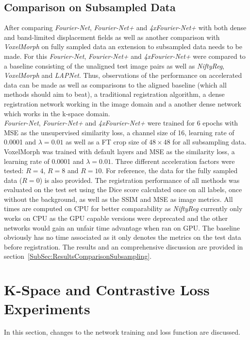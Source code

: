 \documentclass[english,version-2022-01]{uzl-thesis} %
\begin{document}
\subsection{Comparison on Subsampled Data} \label{SubSec:ComparisonSubsampling}
After comparing \emph{Fourier-Net}, \emph{Fourier-Net+} and \emph{4xFourier-Net+} with both dense and band-limited displacement fields as well as another comparison with \emph{VoxelMorph} on fully sampled data 
an extension to subsampled data needs to be made. For this \emph{Fourier-Net}, \emph{Fourier-Net+} and \emph{4xFourier-Net+} were compared to a baseline consisting of the unaligned test image pairs as well as \emph{NiftyReg}, \emph{VoxelMorph} and \emph{LAPNet}. Thus, observations of the performance on accelerated data can be made as well as comparisons to the aligned baseline (which all methods should aim to beat), a traditional registration algorithm, a dense registration network working in the image domain and a another dense network which works in the k-space domain.\\
\emph{Fourier-Net}, \emph{Fourier-Net+} and \emph{4xFourier-Net+} were trained for 6 epochs with MSE as the unsupervised similarity loss, a channel size of 16, learning rate of 0.0001 and $\lambda=0.01$ as well as a FT crop size of $48 \times 48$ for all subsampling data. VoxelMorph was trained with default layers and MSE as the similarity loss, a learning rate of 0.0001 and $\lambda=0.01$. Three different acceleration factors were tested: $R=4$, $R=8$ and $R=10$. For reference, the data for the fully sampled data ($R=0$) is also provided. The registration performance of all methods was evaluated on the test set using the Dice score calculated once on all labels, once without the background, as well as the SSIM and MSE as image metrics. All times are computed on CPU for better comparability as \emph{NiftyReg} currently only works on CPU as the GPU capable versions were deprecated and the other networks would gain an unfair time advantage when ran on GPU. The baseline obviously has no time associated as it only denotes the metrics on the test data before registration. The results and an comprehensive discussion are provided in section~\ref{SubSec:ResultsComparisonSubsampling}.


\section{K-Space and Contrastive Loss Experiments} \label{Sec:K-SpaceAndContrastiveLossExperiments}
In this section, changes to the network training and loss function are discussed.
\end{document}
